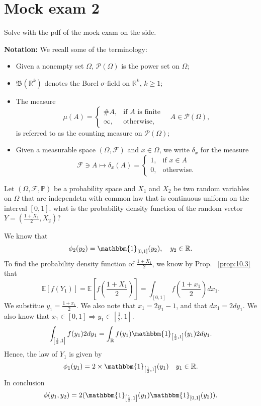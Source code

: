 
\chapter{Mock exam 2}%
\label{cha:Mock exam 2}
Solve with the pdf of the mock exam on the side.

\textbf{Notation:} We recall some of the terminology:
\begin{itemize}
    \item Given a nonempty set $\Omega$, $\mathcal{P}(\Omega)$ is the power set on $\Omega$;
    \item $\mathfrak{B}(\mathbb{R}^k)$ denotes the Borel $\sigma$-field on $\mathbb{R}^k$, $k \geq 1$;
    \item The measure
    \[
    \mu(A) = 
    \begin{cases} 
    \#A, & \text{if } A \text{ is finite} \\
    \infty, & \text{otherwise},
    \end{cases}
    \quad A \in \mathcal{P}(\Omega),
    \]
    is referred to as the counting measure on $\mathcal{P}(\Omega)$;
    \item Given a measurable space $(\Omega, \mathcal{F})$ and $x \in \Omega$, we write $\delta_x$ for the measure
    \[
    \mathcal{F} \ni A \mapsto \delta_x(A) = 
    \begin{cases} 
    1, & \text{if } x \in A \\
    0, & \text{otherwise}.
    \end{cases}
    \]
\end{itemize}

\begin{exercise}[]
    \label{ex:13.4}
    Let $(\Omega, \mathcal{F}, \mathbb{P})$ be a probability space and $X_1 $ and $X_2 $ be two
    random variables on $\Omega$ that are independetn with common law that is continuous uniform
    on the interval $\left[ 0,1 \right]  $. what is the probability density function of the random
    vector $Y = \left( \frac{1+X_1}{2}, X_2 \right)$?

    We know that 
    \[
    \phi_2(y_2) = \mathbbm{1}_{\left[ 0,1 \right] }(y_2), \quad y_2 \in \mathbb{R}
    .\] 
    To find the probability density function of $\frac{1+X_1}{2}$, we know by Prop. ~\ref{prop:10.3} that
    \[
      \mathbb{E}\left[ f(Y_1) \right] = \mathbb{E}\left[ f\left( \frac{1+X_1}{2} \right)  \right] 
      = \int_{\left[ 0,1 \right] } f\left( \frac{1+x_1}{2} \right)dx_1
    .\] 
    We substitue $y_1 = \frac{1+x_1}{2} $. We also note that $x_1 = 2y_1-1 $, and that
    $dx_1= 2dy_1 $. We also know that $x_1 \in \left[ 0,1 \right] \Rightarrow y_1 \in \left[ \frac{1}{2}, 1 \right]  $.
    \[
      \int_{\left[ \frac{1}{2},1 \right] } f(y_1) 2dy_1 
      = \int_{\mathbb{R}} f(y_1) \mathbbm{1}_{\left[ \frac{1}{2}, 1 \right] }(y_1) 2 dy_1 
    .\] 
    Hence, the law of $Y_1 $ is given by
    \[
    \phi_1(y_1) = 2 \times \mathbbm{1}_{\left[ \frac{1}{2}, 1 \right] }(y_1)  \quad y_1 \in \mathbb{R} 
    .\] 
    In conclusion
    \[
    \phi(y_1, y_2) = 2(\mathbbm{1}_{\left[ \frac{1}{2}, 1 \right] }(y_1) \mathbbm{1}_{\left[ 0,1 \right] }(y_2)  )
    .\] 


\end{exercise}

